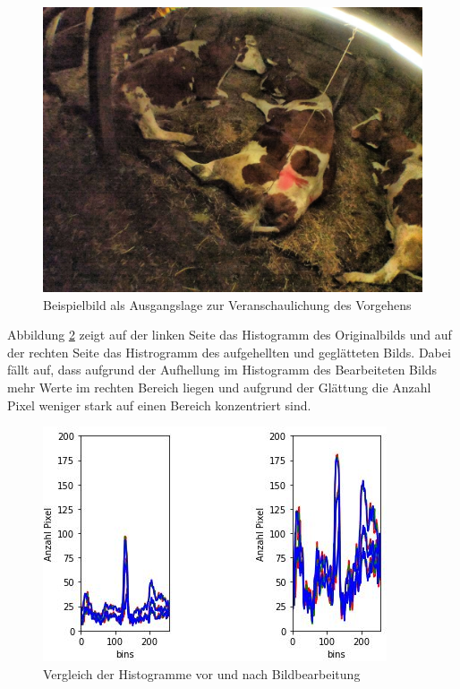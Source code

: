 \begin{figure}[H]
	\center
	\includegraphics[scale=0.43]{Grafiken/entwicklung/1ausgangsbildBericht.jpg}
	\caption{Beispielbild als Ausgangslage zur Veranschaulichung des Vorgehens} 
	\label{fig: Bild als Ausgangslage zur Veranschaulichung des Vorgehens}
\end{figure}

Abbildung \ref{fig: Vergleich der Histogramme vor und nach Bildbearbeitung} zeigt auf der linken Seite das Histogramm des Originalbilds und auf der rechten Seite das Histrogramm des aufgehellten und geglätteten Bilds. Dabei fällt auf, dass aufgrund der Aufhellung im Histogramm des Bearbeiteten Bilds mehr Werte im rechten Bereich liegen und aufgrund der Glättung die Anzahl Pixel weniger stark auf einen Bereich konzentriert sind.

\begin{figure}[H]
	\center
	\includegraphics[scale=0.9]{Grafiken/entwicklung/2HistrogrammVergleich.jpg}
	\caption{Vergleich der Histogramme vor und nach Bildbearbeitung} 
	\label{fig: Vergleich der Histogramme vor und nach Bildbearbeitung}
\end{figure}

